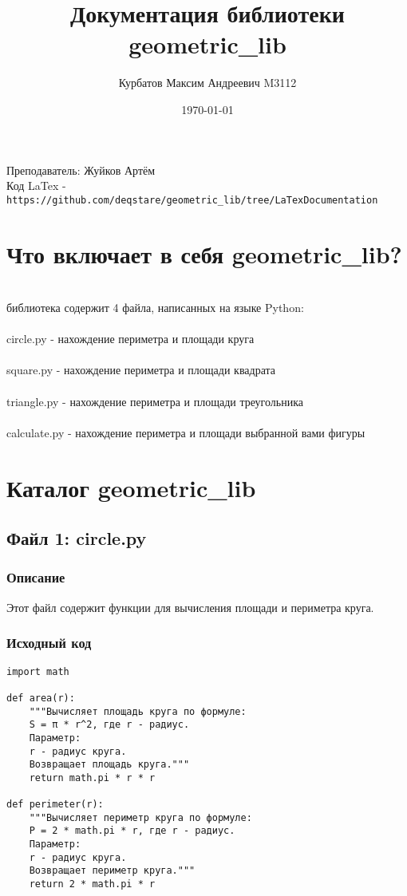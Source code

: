 \documentclass{article}
\title{Документация библиотеки geometric\_lib}
\author{Курбатов Максим Андреевич M3112}
\date{\today}
\begin{document}
\maketitle
\begin{center}
\large Преподаватель: Жуйков Артём\\
\large Код LaTex - \texttt{https://github.com/deqstare/geometric\_lib/tree/LaTexDocumentation} \\
\end{center}

\newpage

\tableofcontents
\newpage
\section{Что включает в себя geometric_lib?}
\\
 библиотека содержит 4 файла, написанных на языке Python:\\
\\
\large circle.py - нахождение периметра и площади круга\\
\\
\large square.py - нахождение периметра и площади квадрата\\
\\
\large triangle.py - нахождение периметра и площади треугольника\\
\\
\large calculate.py - нахождение периметра и площади выбранной вами фигуры\\

\section{Каталог geometric_lib}

\subsection{Файл 1: circle.py}
\subsubsection{Описание}
Этот файл содержит функции для вычисления площади и периметра круга.

\subsubsection{Исходный код}
\begin{verbatim}
import math

def area(r):
    """Вычисляет площадь круга по формуле: 
    S = π * r^2, где r - радиус.
    Параметр:
    r - радиус круга.
    Возвращает площадь круга."""
    return math.pi * r * r

def perimeter(r):
    """Вычисляет периметр круга по формуле: 
    P = 2 * math.pi * r, где r - радиус.
    Параметр:
    r - радиус круга.
    Возвращает периметр круга."""
    return 2 * math.pi * r
\end{verbatim}
\end{document}
